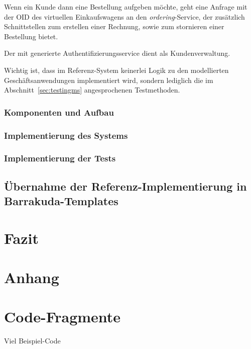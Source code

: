 \documentclass[12pt,a4paper,bibliography=totocnumbered,listof=totocnumbered]{scrartcl}
\begin{document}
Wenn ein Kunde dann eine Bestellung aufgeben möchte, geht eine Anfrage mit der OID des virtuellen Einkaufswagens an den \textit{ordering}-Service, der zusätzlich Schnittstellen zum erstellen einer Rechnung, sowie zum stornieren einer Bestellung bietet.

Der mit generierte Authentifizierungsservice dient als Kundenverwaltung.


Wichtig ist, dass im Referenz-System keinerlei Logik zu den modellierten Geschäftsanwendungen implementiert wird, sondern lediglich die im Abschnitt~\ref{sec:testingms} angesprochenen Testmethoden.

\subsubsection{Komponenten und Aufbau}

\subsubsection{Implementierung des Systems}

\subsubsection{Implementierung der Tests}

\subsection{Übernahme der Referenz-Implementierung in Barrakuda-Templates}

\section{Fazit}

\renewcommand\refname{Quellenverzeichnis}


\pagebreak

\setcounter{page}{1}

\begin{appendix}
\section*{Anhang}
{}

\section{Code-Fragmente}
Viel Beispiel-Code

\end{appendix}
\end{document}
